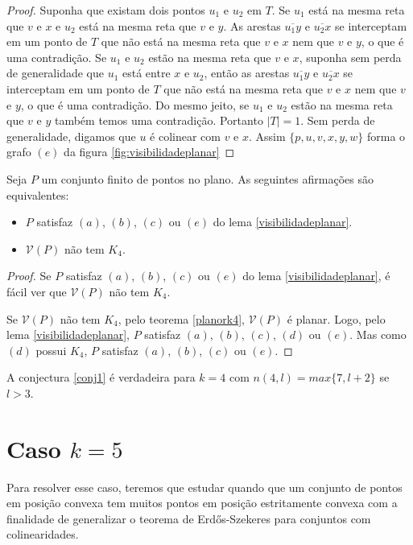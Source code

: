 \begin{proof}
    Suponha que existam dois pontos $u_1$ e $u_2$ em $T$. Se $u_1$ está na mesma reta que $v$ e $x$ e $u_2$ está na mesma reta que $v$ e $y$. As arestas $\overline{u_1y}$ e $\overline{u_2x}$ se interceptam em um ponto de $T$ que não está na mesma reta que $v$ e $x$ nem que $v$ e $y$, o que é uma contradição. Se $u_1$ e $u_2$ estão na mesma reta que $v$ e $x$, suponha sem perda de generalidade que $u_1$ está entre $x$ e $u_2$, então as arestas $\overline{u_1y}$ e $\overline{u_2x}$ se interceptam em um ponto de $T$ que não está na mesma reta que $v$ e $x$ nem que $v$ e $y$, o que é uma contradição. Do mesmo jeito, se $u_1$ e $u_2$ estão na mesma reta que $v$ e $y$ também temos uma contradição. Portanto $|T|=1$. Sem perda de generalidade, digamos que $u$ é colinear com $v$ e $x$. Assim $\{p,u,v,x,y,w\}$ forma o grafo $(e)$ da figura \ref{fig:visibilidadeplanar}
\end{proof}
\begin{teorema}
    Seja $P$ um conjunto finito de pontos no plano. As seguintes afirmações são equivalentes:
    \begin{itemize}
        \item
            $P$ satisfaz $(a)$, $(b)$, $(c)$ ou $(e)$ do lema \ref{visibilidadeplanar}.
        \item
            $\mathcal V(P)$ não tem $K_4$.
    \end{itemize}
\end{teorema}
\begin{proof}
    Se $P$ satisfaz $(a)$, $(b)$, $(c)$ ou $(e)$ do lema \ref{visibilidadeplanar}, é fácil ver que $\mathcal V(P)$ não tem $K_4$.

    Se $\mathcal V(P)$ não tem $K_4$, pelo teorema \ref{planork4}, $\mathcal V(P)$ é planar. Logo, pelo lema \ref{visibilidadeplanar}, $P$ satisfaz $(a)$, $(b)$, $(c)$, $(d)$ ou $(e)$. Mas como $(d)$ possui $K_4$, $P$ satisfaz $(a)$, $(b)$, $(c)$ ou $(e)$.
\end{proof}

\begin{corolario}
    A conjectura \ref{conj1} é verdadeira para $k=4$ com $n(4,l)=max\{7,l+2\}$ se $l>3$.
\end{corolario}

\section{Caso $k=5$}
Para resolver esse caso, teremos que estudar quando que um conjunto de pontos em posição convexa tem muitos pontos em posição estritamente convexa com a finalidade de generalizar o teorema de Erd\H os-Szekeres para conjuntos com colinearidades.

